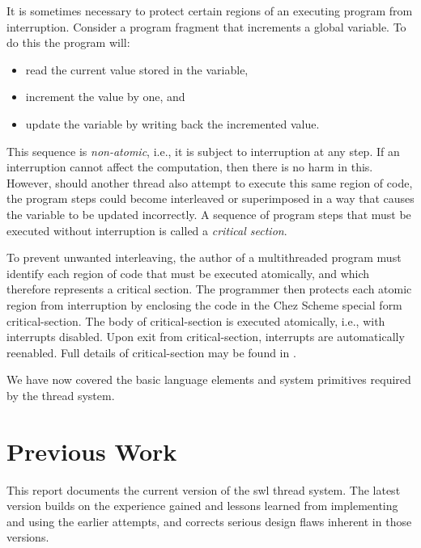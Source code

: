 \documentclass{article}
\begin{document}
It is sometimes necessary to protect certain regions of an executing
program from interruption.  Consider a program fragment that
increments a global variable.  To do this the program will: 

\begin{itemize}

\item read
the current value stored in the variable, 

\item increment the value by
one, and 

\item update the variable by writing back the incremented
value.  

\end{itemize}

This sequence is {\em non-atomic}, i.e., it is subject to interruption
at any step.  If an interruption cannot affect the computation, then
there is no harm in this.  However, should another thread also attempt
to execute this same region of code, the program steps could become
interleaved or superimposed in a way that causes the variable to be
updated incorrectly. A sequence of program steps that must be executed
without interruption is called a {\em critical section}.

To prevent unwanted interleaving, the author of a multithreaded
program must identify each region of code that must be executed
atomically, and which therefore represents a critical section.  The
programmer then protects each atomic region from interruption by
enclosing the code in the Chez Scheme special form {\sf
critical-section}.  The body of {\sf critical-section} is executed
atomically, i.e., with interrupts disabled.  Upon exit from {\sf
critical-section}, interrupts are automatically reenabled.  Full
details of {\sf critical-section} may be found in \cite{CSSM}.

We have now covered the basic language elements and system primitives
required by the thread system.



\section{Previous Work}

This report documents the current version of the {\sc swl} thread system.
The latest version builds on the experience gained and lessons learned
from implementing and using the earlier attempts, and corrects serious
design flaws inherent in those versions.
\end{document}
